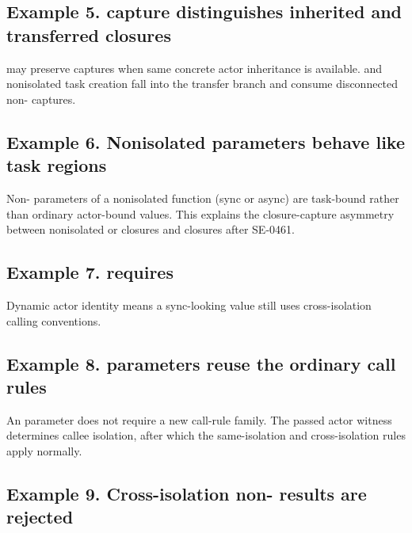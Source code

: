 \subsection{Example 5.  capture distinguishes inherited and transferred closures}

 may preserve captures when same concrete actor inheritance is available.
 and nonisolated task creation fall into the transfer branch and consume disconnected non- captures.


\subsection{Example 6. Nonisolated parameters behave like task regions}

Non- parameters of a nonisolated function (sync or async) are task-bound rather than ordinary actor-bound values. This explains the closure-capture asymmetry between nonisolated or  closures and  closures after SE-0461.


\subsection{Example 7.  requires }

Dynamic actor identity means a sync-looking  value still uses cross-isolation calling conventions.


\subsection{Example 8.  parameters reuse the ordinary call rules}

An  parameter does not require a new call-rule family. The passed actor witness determines callee isolation, after which the same-isolation and cross-isolation rules apply normally.


\subsection{Example 9. Cross-isolation non- results are rejected}

